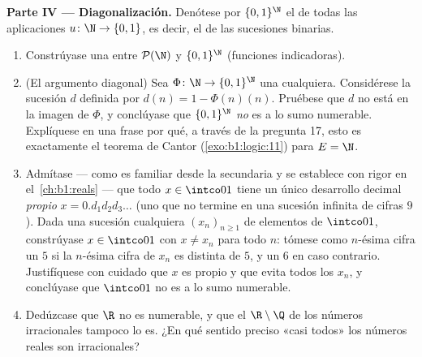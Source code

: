 \begin{problem}
\medskip
\noindent\textbf{Parte IV --- Diagonalización.} Denótese por
$\{0,1\}^{\N}$ el  de todas las aplicaciones
$u \colon \N \to \{0, 1\}$, es decir, el  de las sucesiones
binarias.
\begin{enumerate}[resume]
  \item Constrúyase una  entre $\mathcal{P}(\N)$ y
        $\{0,1\}^{\N}$ (funciones indicadoras).
  \item (El argumento diagonal) Sea $\Phi \colon \N \to
        \{0,1\}^{\N}$ una  cualquiera. Considérese la
        sucesión $d$ definida por $d(n) = 1 - \Phi(n)(n)$. Pruébese que
        $d$ no está en la imagen de $\Phi$, y conclúyase que
        $\{0,1\}^{\N}$ \emph{no} es a lo sumo numerable. Explíquese en
        una frase por qué, a través de la pregunta 17, esto es
        exactamente el teorema de Cantor (\cref{exo:b1:logic:11}) para
        $E = \N$.
  \item Admítase --- como es familiar desde la secundaria y se establece
        con rigor en el~\cref{ch:b1:reals} --- que todo $x \in
        \intco01$ tiene un único desarrollo decimal \emph{propio} $x =
        0.d_1 d_2 d_3\dots$ (uno que no termine en una sucesión infinita
        de cifras $9$). Dada una sucesión cualquiera $(x_n)_{n \geq 1}$ de
        elementos de $\intco01$, constrúyase $x \in \intco01$ con
        $x \neq x_n$ para todo $n$: tómese como $n$-ésima cifra un $5$ si
        la $n$-ésima cifra de $x_n$ es distinta de $5$, y un $6$ en caso
        contrario. Justifíquese con cuidado que $x$ es propio y que
        evita todos los $x_n$, y conclúyase que $\intco01$ no es a lo
        sumo numerable.
  \item Dedúzcase que $\R$ no es numerable, y que el 
        $\R \setminus \Q$ de los números irracionales tampoco lo es. ¿En
        qué sentido preciso «casi todos» los números reales son
        irracionales?
\end{enumerate}


\end{problem}
